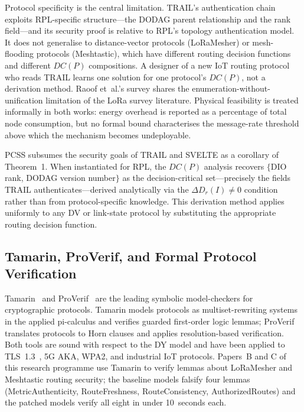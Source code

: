 \documentclass[journal,compsoc]{IEEEtran}
\theoremstyle{plain}
\theoremstyle{definition}
\theoremstyle{remark}
\begin{document}
Protocol specificity is the central limitation.  TRAIL's authentication
chain exploits RPL-specific structure---the DODAG parent relationship and
the rank field---and its security proof is relative to RPL's topology
authentication model.  It does not generalise to distance-vector protocols
(LoRaMesher) or mesh-flooding protocols (Meshtastic), which have different
routing decision functions and different $\mathit{DC}(P)$ compositions.  A
designer of a new IoT routing protocol who reads TRAIL learns one solution
for one protocol's $\mathit{DC}(P)$, not a derivation method.  Raoof
et~al.'s survey shares the enumeration-without-unification limitation of
the LoRa survey literature.  Physical feasibility is treated informally in
both works: energy overhead is reported as a percentage of total node
consumption, but no formal bound characterises the message-rate threshold
above which the mechanism becomes undeployable.

PCSS subsumes the security goals of TRAIL and SVELTE as a corollary of
Theorem~1.  When instantiated for RPL, the $\mathit{DC}(P)$ analysis
recovers $\{$DIO rank, DODAG version number$\}$ as the decision-critical
set---precisely the fields TRAIL authenticates---derived analytically via
the $\Delta D_r(I) \neq 0$ condition rather than from protocol-specific
knowledge.  This derivation method applies uniformly to any DV or link-state
protocol by substituting the appropriate routing decision function.

\subsection{Tamarin, ProVerif, and Formal Protocol Verification}

Tamarin~\cite{meier2013tamarin} and ProVerif~\cite{blanchet2016proverif}
are the leading symbolic model-checkers for cryptographic protocols.
Tamarin models protocols as multiset-rewriting systems in the applied
pi-calculus and verifies guarded first-order logic lemmas; ProVerif
translates protocols to Horn clauses and applies resolution-based
verification.  Both tools are sound with respect to the DY model and have
been applied to TLS~1.3~\cite{basin2018formal5g}, 5G AKA, WPA2, and
industrial IoT protocols.  Papers~B and C of this research programme use
Tamarin to verify lemmas about LoRaMesher and Meshtastic routing security;
the baseline models falsify four lemmas (MetricAuthenticity,
RouteFreshness, RouteConsistency, AuthorizedRoutes) and the patched models
verify all eight in under 10~seconds each.
\end{document}
